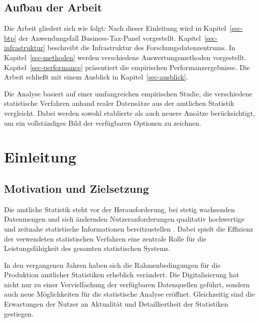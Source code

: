 \documentclass[
  ngerman,
  10pt,
  letterpaper,
  twocolumn]{book}
\begin{document}
\section*{Aufbau der Arbeit}\label{aufbau-der-arbeit}


Die Arbeit gliedert sich wie folgt: Nach dieser Einleitung wird in
Kapitel~\ref{sec-btp} der Anwendungsfall Business-Tax-Panel vorgestellt.
Kapitel~\ref{sec-infrastruktur} beschreibt die Infrastruktur des
Forschungsdatenzentrums. In Kapitel~\ref{sec-methoden} werden
verschiedene Auswertungsmethoden vorgestellt.
Kapitel~\ref{sec-performance} präsentiert die empirischen
Performanzergebnisse. Die Arbeit schließt mit einem Ausblick in
Kapitel~\ref{sec-ausblick}.

Die Analyse basiert auf einer umfangreichen empirischen Studie, die
verschiedene statistische Verfahren anhand realer Datensätze aus der
amtlichen Statistik vergleicht. Dabei werden sowohl etablierte als auch
neuere Ansätze berücksichtigt, um ein vollständiges Bild der verfügbaren
Optionen zu zeichnen.


\chapter{Einleitung}\label{sec-einleitung}

\section{Motivation und Zielsetzung}\label{motivation-und-zielsetzung-1}

Die amtliche Statistik steht vor der Herausforderung, bei stetig
wachsenden Datenmengen und sich ändernden Nutzeranforderungen qualitativ
hochwertige und zeitnahe statistische Informationen bereitzustellen
\autocite{destatis2023}. Dabei spielt die Effizienz der verwendeten
statistischen Verfahren eine zentrale Rolle für die Leistungsfähigkeit
des gesamten statistischen Systems.

In den vergangenen Jahren haben sich die Rahmenbedingungen für die
Produktion amtlicher Statistiken erheblich verändert. Die
Digitalisierung hat nicht nur zu einer Vervielfachung der verfügbaren
Datenquellen geführt, sondern auch neue Möglichkeiten für die
statistische Analyse eröffnet. Gleichzeitig sind die Erwartungen der
Nutzer an Aktualität und Detailliertheit der Statistiken gestiegen.
\end{document}
